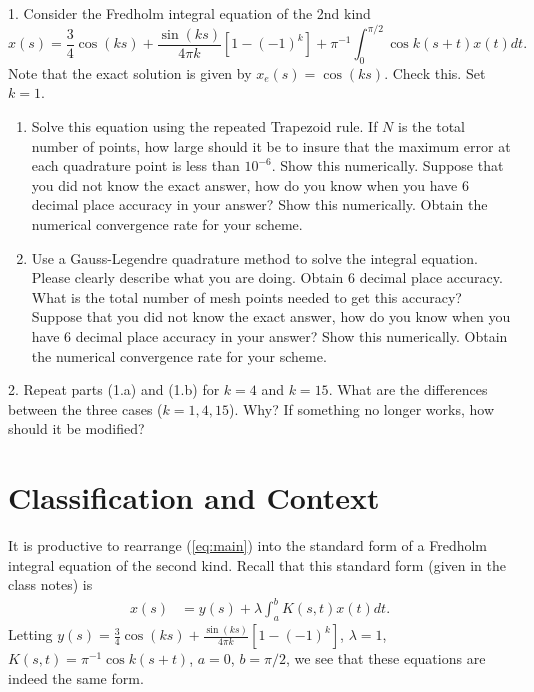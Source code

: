 \documentclass[10pt]{article}
\begin{document}
\begin{description}[wide = 0pt]

\item 1. Consider the Fredholm integral equation of the 2nd kind
\begin{equation}
    x(s) = \frac{3}{4} \cos (ks) + \frac{\sin (ks)}{4\pi k} [1 - (-1)^k] + \pi^{-1} \int_{0}^{\pi/2} \cos k(s + t) x(t) dt\label{eq:main}. 
\end{equation}
Note that the exact solution is given by $x_e(s) = \cos (ks)$. Check this. Set $k = 1$.

\begin{enumerate}[label=(\alph*)]
\item Solve this equation using the repeated Trapezoid rule. If $N$ is the total number of points, how large should it be to insure that the maximum error at each quadrature point is less than $10^{-6}$. Show this numerically. Suppose that you did not know the exact answer, how do you know when you have 6 decimal place accuracy in your answer? Show this numerically. Obtain the numerical convergence rate for your scheme.

\item Use a Gauss-Legendre quadrature method to solve the integral equation. Please clearly describe what you are doing. Obtain 6 decimal place accuracy. What is the total number of mesh points needed to get this accuracy? Suppose that you did not know the exact answer, how do you know when you have 6 decimal place accuracy in your answer? Show this numerically. Obtain the numerical convergence rate for your scheme.

\end{enumerate}


\item 2. Repeat parts (1.a) and (1.b) for $k = 4$ and $k = 15$. What are the differences between the three cases ($k = 1, 4, 15$). Why? If something no longer works, how should it be modified?

\section*{Classification and Context}
It is productive to rearrange (\ref{eq:main}) into the standard form of a Fredholm integral equation of the second kind. Recall that this standard form (given in the class notes) is 
\begin{align}
    x(s) &= y(s) + \lambda \int_a^b K(s, t) x(t) dt. \label{classify}
\end{align}
Letting $y(s) = \frac{3}{4} \cos (ks) + \frac{\sin (ks)}{4\pi k} [1 - (-1)^k]$, $\lambda = 1$, $K(s, t) = \pi^{-1}\cos k (s + t)$, $a = 0$, $b = \pi/2$, we see that these equations are indeed the same form. 


\end{description}
\end{document}
